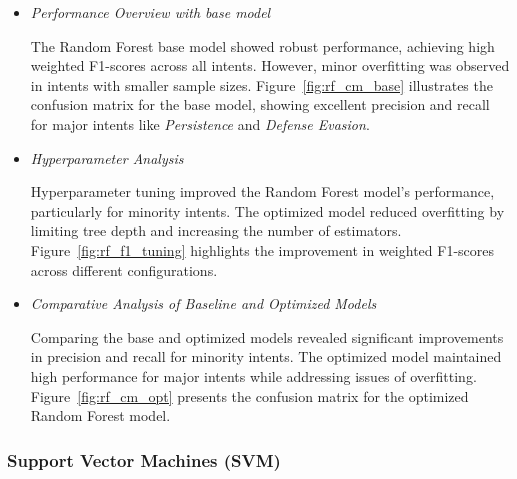             \begin{itemize}
        
                \item \textit{Performance Overview with base model}
                
                    \vspace{0.3em}

                    The Random Forest base model showed robust performance, achieving high weighted F1-scores across all intents. However, minor overfitting was observed in intents with smaller sample sizes. Figure~\ref{fig:rf_cm_base} illustrates the confusion matrix for the base model, showing excellent precision and recall for major intents like \textit{Persistence} and \textit{Defense Evasion}.

                \vspace{0.5em}

                \item \textit{Hyperparameter Analysis}
                
                    \vspace{0.3em}

                    Hyperparameter tuning improved the Random Forest model's performance, particularly for minority intents. The optimized model reduced overfitting by limiting tree depth and increasing the number of estimators. Figure~\ref{fig:rf_f1_tuning} highlights the improvement in weighted F1-scores across different configurations.

                \vspace{0.5em}

                \item \textit{Comparative Analysis of Baseline and Optimized Models}
                
                    \vspace{0.3em}

                    Comparing the base and optimized models revealed significant improvements in precision and recall for minority intents. The optimized model maintained high performance for major intents while addressing issues of overfitting. Figure~\ref{fig:rf_cm_opt} presents the confusion matrix for the optimized Random Forest model.
                
            \end{itemize}

        \subsubsection{Support Vector Machines (SVM)}
        
